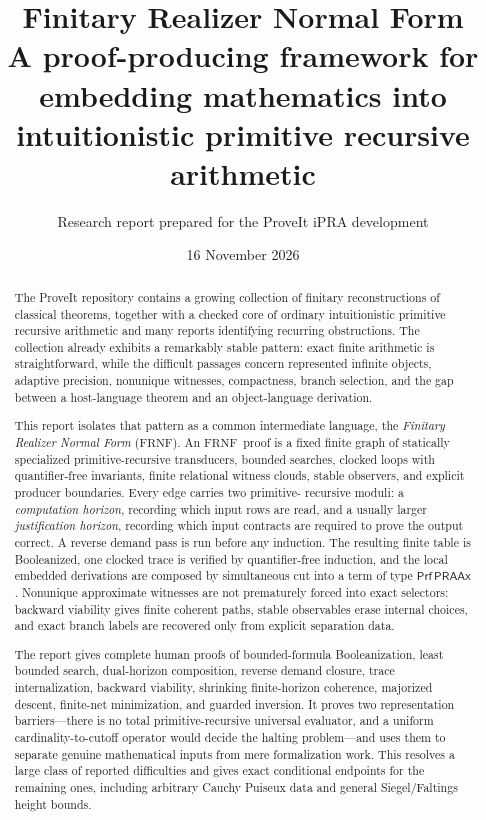 \documentclass[11pt,oneside]{article}
\title{\textbf{Finitary Realizer Normal Form}\\
A proof-producing framework for embedding mathematics into\\
intuitionistic primitive recursive arithmetic}
\author{Research report prepared for the ProveIt iPRA development}
\date{16 November 2026}
\theoremstyle{definition}
\theoremstyle{remark}
\newcommand{\FRNF}{\ensuremath{\mathrm{FRNF}}}
\newcommand{\PRAAx}{\ensuremath{\mathsf{PRAAx}}}
\newcommand{\Prf}{\ensuremath{\mathsf{Prf}}}
\begin{document}
\maketitle

\begin{abstract}
The ProveIt repository contains a growing collection of finitary reconstructions of
classical theorems, together with a checked core of ordinary intuitionistic primitive
recursive arithmetic and many reports identifying recurring obstructions.  The
collection already exhibits a remarkably stable pattern: exact finite arithmetic is
straightforward, while the difficult passages concern represented infinite objects,
adaptive precision, nonunique witnesses, compactness, branch selection, and the gap
between a host-language theorem and an object-language derivation.

This report isolates that pattern as a common intermediate language, the
\emph{Finitary Realizer Normal Form} (\FRNF).  An \FRNF\ proof is a fixed finite graph
of statically specialized primitive-recursive transducers, bounded searches, clocked
loops with quantifier-free invariants, finite relational witness clouds, stable
observers, and explicit producer boundaries.  Every edge carries two primitive-
recursive moduli: a \emph{computation horizon}, recording which input rows are read,
and a usually larger \emph{justification horizon}, recording which input contracts
are required to prove the output correct.  A reverse demand pass is run before any
induction.  The resulting finite table is Booleanized, one clocked trace is verified
by quantifier-free induction, and the local embedded derivations are composed by
simultaneous cut into a term of type \(\Prf\,\PRAAx\).  Nonunique approximate
witnesses are not prematurely forced into exact selectors: backward viability gives
finite coherent paths, stable observables erase internal choices, and exact branch
labels are recovered only from explicit separation data.

The report gives complete human proofs of bounded-formula Booleanization, least
bounded search, dual-horizon composition, reverse demand closure, trace
internalization, backward viability, shrinking finite-horizon coherence, majorized
descent, finite-net minimization, and guarded inversion.  It proves two representation
barriers---there is no total primitive-recursive universal evaluator, and a uniform
cardinality-to-cutoff operator would decide the halting problem---and uses them to
separate genuine mathematical inputs from mere formalization work.  This resolves a
large class of reported difficulties and gives exact conditional endpoints for the
remaining ones, including arbitrary Cauchy Puiseux data and general Siegel/Faltings
height bounds.


\end{abstract}
\end{document}
